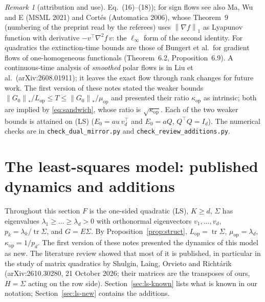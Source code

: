 \documentclass[11pt]{article}
\theoremstyle{definition}
\theoremstyle{remark}
\newtheorem{remark}[theorem]{Remark}
\newcommand{\norm}[1]{\left\|#1\right\|}
\newcommand{\nnuc}[1]{\left\|#1\right\|_{*}}
\newcommand{\tr}{\operatorname{tr}}
\newcommand{\Lop}{L_{\mathrm{op}}}
\newcommand{\muop}{\mu_{\mathrm{op}}}
\newcommand{\kop}{\kappa_{\mathrm{op}}}
\begin{document}
\begin{remark}[attribution and use]
Eq.~(16)--(18)); for sign flows see also Ma, Wu and E (MSML 2021) and Cort\'es (Automatica 2006), whose Theorem~9
(numbering of the preprint read by the referees) uses
$\norm{\nabla f}_1$ as Lyapunov function with derivative $-v^\top\nabla^2f\,v$: the $\ell_\infty$ form of the second
identity. For quadratics the extinction-time bounds are those of Bungert et al.\ for gradient flows of one-homogeneous
functionals (Theorem~6.2, Proposition~6.9). A continuous-time analysis of \emph{smoothed} polar flows is in Liu et al.\
(arXiv:2608.01911); it leaves the exact flow through rank changes for future work. The first version of these notes
stated the weaker bounds $\nnuc{G_0}/\Lop\le T\le\nnuc{G_0}/\muop$ and presented their ratio $\kop$ as intrinsic; both
are implied by \eqref{eq:sandwich}, whose ratio is $\sqrt{\kop}$. Each of the two weaker bounds is attained on (LS)
($E_0=au\,v_d^\top$ and $E_0=aQ$, $Q^\top Q=I_d$). The numerical checks are in \texttt{check\_dual\_mirror.py} and
\texttt{check\_review\_additions.py}.
\end{remark}

\section{The least-squares model: published dynamics and additions}\label{sec:ls}

Throughout this section $F$ is the one-sided quadratic (LS), $K\ge d$, $\Sigma$ has eigenvalues
$\lambda_1\ge\dots\ge\lambda_d>0$ with orthonormal eigenvectors $v_1,\dots,v_d$, $p_k=\lambda_k/\tr\Sigma$, and
$G=E\Sigma$. By Proposition~\ref{prop:struct}, $\Lop=\tr\Sigma$, $\muop=\lambda_d$, $\kop=1/p_d$. The first version of
these notes presented the dynamics of this model as new. The literature review showed that most of it is published,
in particular in the study of matrix quadratics by Shulgin, Laing, Orvieto and Richt\'arik (arXiv:2610.30280, 21 October
2026; their matrices are the transposes of ours, $H=\Sigma$ acting on the row side). Section~\ref{sec:ls-known} lists
what is known in our notation; Section~\ref{sec:ls-new} contains the additions.
\end{document}

